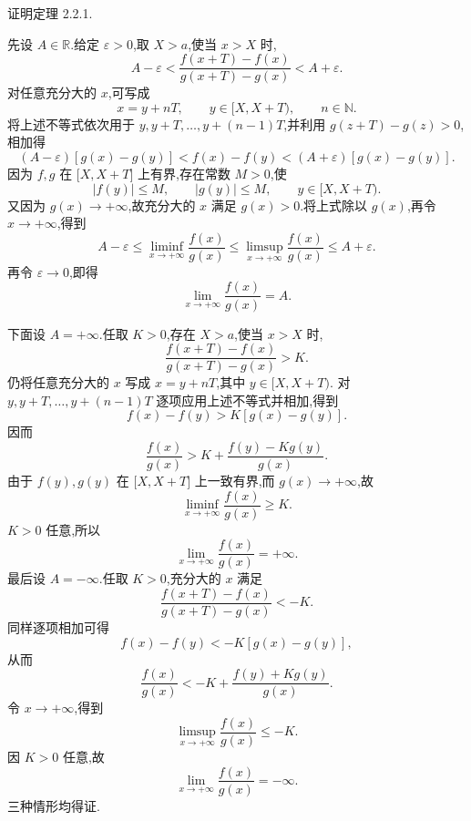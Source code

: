 \begin{example}
    证明定理 2.2.1.
\end{example}
\exampleblank

\begin{solution}
    先设 $A\in\mathbb{R}$.给定 $\varepsilon>0$,取 $X>a$,使当 $x>X$ 时,
    \[
        A-\varepsilon<
        \dfrac{f(x+T)-f(x)}{g(x+T)-g(x)}
        <A+\varepsilon.
    \]
    对任意充分大的 $x$,可写成
    \[
        x=y+nT,\qquad y\in\lbrack X,X+T),\qquad n\in\mathbb{N}.
    \]
    将上述不等式依次用于 $y,y+T,\ldots,y+(n-1)T$,并利用
    $g(z+T)-g(z)>0$,相加得
    \[
        (A-\varepsilon)[g(x)-g(y)]
        <f(x)-f(y)
        <(A+\varepsilon)[g(x)-g(y)].
    \]
    因为 $f,g$ 在 $\lbrack X,X+T\rbrack$ 上有界,存在常数 $M>0$,使
    \[
        |f(y)|\leq M,\qquad |g(y)|\leq M,
        \qquad y\in\lbrack X,X+T).
    \]
    又因为 $g(x)\to+\infty$,故充分大的 $x$ 满足 $g(x)>0$.将上式除以
    $g(x)$,再令 $x\to+\infty$,得到
    \[
        A-\varepsilon
        \leq
        \liminf\limits_{x\to+\infty}\dfrac{f(x)}{g(x)}
        \leq
        \limsup\limits_{x\to+\infty}\dfrac{f(x)}{g(x)}
        \leq
        A+\varepsilon.
    \]
    再令 $\varepsilon\to0$,即得
    \[
        \lim\limits_{x\to+\infty}\dfrac{f(x)}{g(x)}=A.
    \]

    下面设 $A=+\infty$.任取 $K>0$,存在 $X>a$,使当 $x>X$ 时,
    \[
        \dfrac{f(x+T)-f(x)}{g(x+T)-g(x)}>K.
    \]
    仍将任意充分大的 $x$ 写成
    $x=y+nT$,其中 $y\in\lbrack X,X+T)$.
    对 $y,y+T,\ldots,y+(n-1)T$ 逐项应用上述不等式并相加,得到
    \[
        f(x)-f(y)>K[g(x)-g(y)].
    \]
    因而
    \[
        \dfrac{f(x)}{g(x)}
        >
        K
        +\dfrac{f(y)-Kg(y)}{g(x)}.
    \]
    由于 $f(y),g(y)$ 在 $\lbrack X,X+T\rbrack$ 上一致有界,而
    $g(x)\to+\infty$,故
    \[
        \liminf\limits_{x\to+\infty}\dfrac{f(x)}{g(x)}\geq K.
    \]
    $K>0$ 任意,所以
    \[
        \lim\limits_{x\to+\infty}\dfrac{f(x)}{g(x)}=+\infty.
    \]
    最后设 $A=-\infty$.任取 $K>0$,充分大的 $x$ 满足
    \[
        \dfrac{f(x+T)-f(x)}{g(x+T)-g(x)}<-K.
    \]
    同样逐项相加可得
    \[
        f(x)-f(y)<-K[g(x)-g(y)],
    \]
    从而
    \[
        \dfrac{f(x)}{g(x)}
        <
        -K
        +\dfrac{f(y)+Kg(y)}{g(x)}.
    \]
    令 $x\to+\infty$,得到
    \[
        \limsup\limits_{x\to+\infty}\dfrac{f(x)}{g(x)}\leq-K.
    \]
    因 $K>0$ 任意,故
    \[
        \lim\limits_{x\to+\infty}\dfrac{f(x)}{g(x)}=-\infty.
    \]
    三种情形均得证.
\end{solution}


